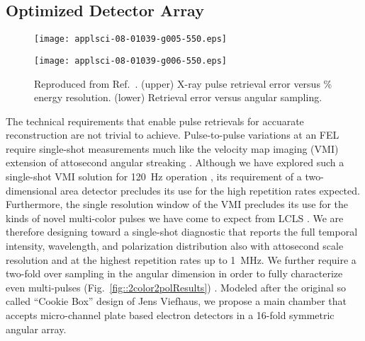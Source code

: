 \subsection*{Optimized Detector Array}
%

\begin{wrapfigure}[26]{r}{3in}
\vspace{-3\baselineskip}
\centerline{\texttt{[image: applsci-08-01039-g005-550.eps]}}
\centerline{\texttt{[image: applsci-08-01039-g006-550.eps]}}
\vspace{-1\baselineskip}
\caption{\label{fig::thomasfigs}Reproduced from Ref.~\cite{Feurer2018}. (upper) X-ray pulse retrieval error versus \% energy resolution.  
(lower) Retrieval error versus angular sampling.}
\end{wrapfigure}

The technical requirements that enable pulse retrievals for accuarate reconstruction are not trivial to achieve.
Pulse-to-pulse variations at an FEL require single-shot measurements much like the velocity map imaging (VMI) \cite{VrakkingRSI} extension of attosecond angular streaking \cite{attoclockVMI2013}.
Although we have explored such a single-shot VMI solution for 120~Hz operation \cite{Siqi2018}, its requirement of a two-dimensional area detector precludes its use for the high repetition rates expected. 
Furthermore, the single resolution window of the VMI precludes its use for the kinds of novel multi-color pulses we have come to expect from LCLS \cite{Lutman13_twocolor,Marinelli13_twocolor,Marinelli2015,Lutman2016,LutmanFreshSlice2016}.
We are therefore designing toward a single-shot diagnostic that reports the full temporal intensity, wavelength, and polarization distribution also with attosecond scale resolution and at the highest repetition rates up to 1~MHz.  
We further require a two-fold over sampling in the angular dimension in order to fully characterize even multi-pulses (Fig.~\ref{fig::2color2polResults}) \cite{Lutman2016,Lutman2016FreshSlice}.
Modeled after the original so called ``Cookie Box'' design of Jens Viefhaus, we propose a main chamber that accepts micro-channel plate based electron detectors in a 16-fold symmetric angular array.

